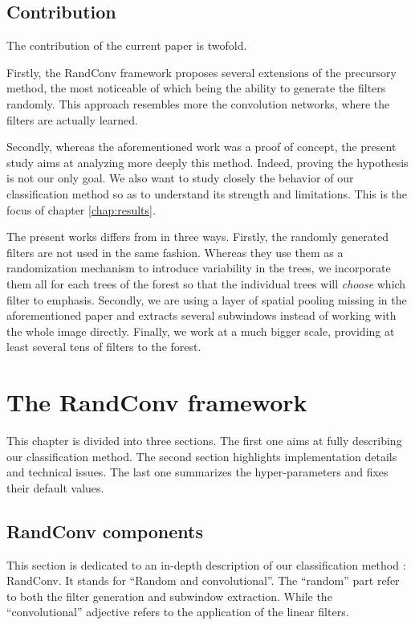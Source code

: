 \documentclass[a4paper]{report}
\begin{document}
	\section{Contribution}
	The contribution of the current paper is twofold.
	\par
	Firstly, the RandConv framework proposes several extensions of the precursory method, the most noticeable of which being the ability to generate the filters randomly. This approach resembles more the convolution networks, where the filters are actually learned.
	\par
	Secondly, whereas the aforementioned work was a proof of concept, the present study aims at analyzing more deeply this method. Indeed, proving the hypothesis is not our only goal. We also want to study closely the behavior of our classification method so as to understand its strength and limitations. This is the focus of chapter \ref{chap:results}.
	\par
	The present works differs from \cite{NearlySame} in three ways. Firstly, the randomly generated filters are not used in the same fashion. Whereas they use them as a randomization mechanism to introduce variability in the trees, we incorporate them all for each trees of the forest so that the individual trees will \textit{choose} which filter to emphasis. Secondly, we are using a layer of spatial pooling missing in the aforementioned paper and extracts several subwindows instead of working with the whole image directly. Finally, we work at a much bigger scale, providing at least several tens of filters to the forest. 

\chapter{\label{chap:RandConv}The RandConv framework}
This chapter is divided into three sections. The first one aims at fully describing our classification method. The second section highlights implementation details and technical issues. The last one summarizes the hyper-parameters and fixes their default values.

	\section{RandConv components}
	This section is dedicated to an in-depth description of our classification method : RandConv. It stands for ``Random and 	convolutional''. The ``random'' part refer to both the filter generation and subwindow extraction. While the ``convolutional'' adjective refers to the application of the linear filters. 
\end{document}
